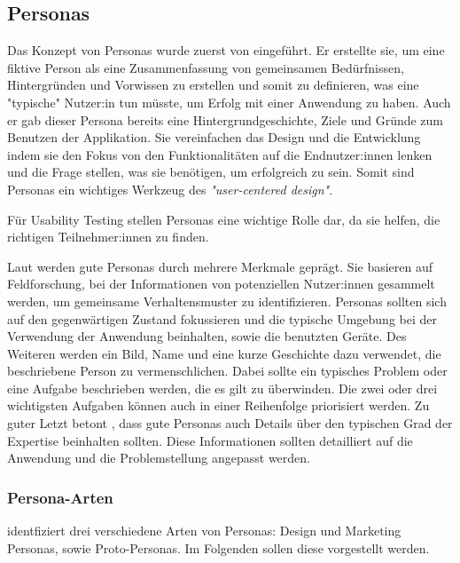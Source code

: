 \subsection{Personas} Das Konzept von Personas wurde zuerst von \textcite{cooperInmatesAre1999}
eingeführt. Er erstellte sie, um eine fiktive Person als eine Zusammenfassung von gemeinsamen
Bedürfnissen, Hintergründen und Vorwissen zu erstellen und somit zu definieren, was eine "typische"
Nutzer:in tun müsste, um Erfolg mit einer Anwendung zu haben. Auch er gab dieser Persona bereits
eine Hintergrundgeschichte, Ziele und Gründe zum Benutzen der Applikation. Sie vereinfachen das
Design und die Entwicklung indem sie den Fokus von den Funktionalitäten auf die Endnutzer:innen
lenken und die Frage stellen, was sie benötigen, um erfolgreich zu sein. Somit sind Personas ein
wichtiges Werkzeug des \textit{"user-centered design"}. \parencite{cooperInmatesAre1999,
tomlinUXOptimization2018}

Für Usability Testing stellen Personas eine wichtige Rolle dar, da sie helfen, die richtigen
Teilnehmer:innen zu finden.
\parencite{tomlinUXOptimization2018}

Laut \textcite{tomlinUXOptimization2018} werden gute Personas durch mehrere Merkmale geprägt. Sie
basieren auf Feldforschung, bei der Informationen von potenziellen Nutzer:innen gesammelt werden, um
gemeinsame Verhaltensmuster zu identifizieren. Personas sollten sich auf den gegenwärtigen Zustand
fokussieren und die typische Umgebung bei der Verwendung der Anwendung beinhalten, sowie die
benutzten Geräte. Des Weiteren werden ein Bild, Name und eine kurze Geschichte dazu verwendet, die
beschriebene Person zu vermenschlichen. Dabei sollte ein typisches Problem oder eine Aufgabe
beschrieben werden, die es gilt zu überwinden. Die zwei oder drei wichtigsten Aufgaben können auch
in einer Reihenfolge priorisiert werden. Zu guter Letzt betont \textcite{tomlinUXOptimization2018},
dass gute Personas auch Details über den typischen Grad der Expertise beinhalten sollten. Diese
Informationen sollten detailliert auf die Anwendung und die Problemstellung angepasst werden.
\parencite{tomlinUXOptimization2018}

\subsubsection{Persona-Arten} 

\textcite{tomlinUXOptimization2018} identfiziert drei verschiedene Arten von Personas: Design und
Marketing Personas, sowie Proto-Personas. Im Folgenden sollen diese vorgestellt werden.

